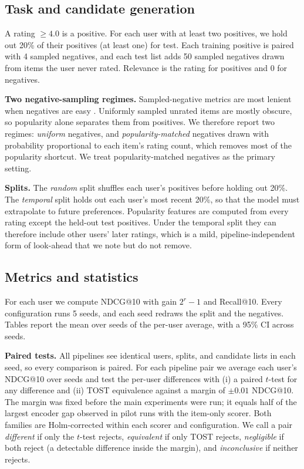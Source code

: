 \subsection{Task and candidate generation}
\label{sec:candidate-generation}
A rating $\geq 4.0$ is a positive. For each user with at least two
positives, we hold out 20\% of their positives (at least one) for test.
Each training positive is paired with 4 sampled negatives, and each test
list adds 50 sampled negatives drawn from items the user never rated.
Relevance is the rating for positives and 0 for negatives.

\textbf{Two negative-sampling regimes.} Sampled-negative metrics are
most lenient when negatives are easy \cite{krichene-sampled}.
Uniformly sampled unrated items are mostly obscure, so popularity alone
separates them from positives. We therefore report two regimes:
\emph{uniform} negatives, and \emph{popularity-matched} negatives drawn
with probability proportional to each item's rating count, which
removes most of the popularity shortcut. We treat popularity-matched
negatives as the primary setting.

\textbf{Splits.} The \emph{random} split shuffles each user's positives
before holding out 20\%. The \emph{temporal} split holds out each
user's most recent 20\%, so that the model must extrapolate to future
preferences. Popularity features are computed from every rating except
the held-out test positives. Under the temporal split they can
therefore include other users' later ratings, which is a mild,
pipeline-independent form of look-ahead that we note but do not remove.

\subsection{Metrics and statistics}
\label{sec:evaluation-metrics}
For each user we compute NDCG@10 with gain $2^{r}-1$ \cite{ndcg} and
Recall@10. Every configuration runs 5 seeds, and each seed redraws the
split and the negatives. Tables report the mean over seeds of the
per-user average, with a 95\% CI across seeds.

\textbf{Paired tests.} All pipelines see identical users, splits, and
candidate lists in each seed, so every comparison is paired. For each
pipeline pair we average each user's NDCG@10 over seeds and test the
per-user differences with (i) a paired $t$-test for any difference and
(ii) TOST equivalence \cite{tost} against a margin of $\pm0.01$
NDCG@10. The margin was fixed before the main experiments were run; it
equals half of the largest encoder gap observed in pilot runs with the
item-only scorer. Both families are Holm-corrected within each
scorer and configuration. We call a pair \emph{different} if only the
$t$-test rejects, \emph{equivalent} if only TOST rejects,
\emph{negligible} if both reject (a detectable difference inside the
margin), and \emph{inconclusive} if neither rejects.

